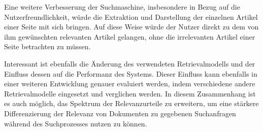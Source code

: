 \documentclass[11pt,a4paper, halfparskip]{scrartcl}
\begin{document}
Eine weitere Verbesserung der Suchmaschine, insbesondere in Bezug auf die Nutzerfreundlichkeit, würde die Extraktion und Darstellung der einzelnen Artikel einer Seite mit sich bringen.
Auf diese Weise würde der Nutzer direkt zu dem von ihm gewünschten relevanten Artikel gelangen, ohne die irrelevanten Artikel einer Seite betrachten zu müssen.  

Interessant ist ebenfalls die Änderung des verwendeten Retrievalmodells und der Einfluss dessen auf die Performanz des Systems.
Dieser Einfluss kann ebenfalls in einer weiteren Entwicklung genauer evaluiert werden, indem verschiedene andere Retrievalmodelle eingesetzt und verglichen werden.
In diesem Zusammenhang ist es auch möglich, das Spektrum der Relevanzurteile zu erweitern, um eine stärkere Differenzierung der Relevanz von Dokumenten zu gegebenen Suchanfragen während des Suchprozesses nutzen zu können.











%
%



%
%

\end{document}
